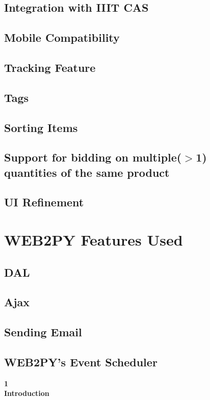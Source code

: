 \documentclass[a4paper,12pt]{article}
\begin{document}
\subsection{Integration with IIIT CAS}
\subsection{Mobile Compatibility}
\subsection{Tracking Feature}
\subsection{Tags}
\subsection{Sorting Items}
\subsection{Support for bidding on multiple($>$1) quantities of the same product}
\subsection{UI Refinement}

\section{WEB2PY Features Used}
\subsection{DAL}
\subsection{Ajax}
\subsection{Sending Email}
\subsection{WEB2PY's Event Scheduler} \newpage


\flushleft
\vspace{15pt}
\huge{\textbf{1 \\ Introduction }} \vspace{12pt}\\
\end{document}
